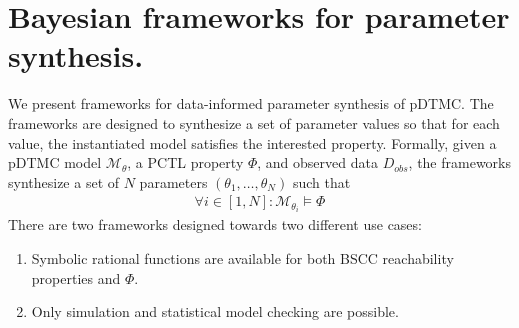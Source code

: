 \chapter{Bayesian frameworks for parameter synthesis.}
We present frameworks for data-informed parameter synthesis of pDTMC. The frameworks are designed to
synthesize a set of parameter values so that for each value, the instantiated model satisfies the
interested property. Formally, given a pDTMC model $\mathcal{M}_\theta$, a PCTL property $\Phi$, and
observed data $D_{obs}$, the frameworks synthesize a set of $N$ parameters
$(\theta_1,\ldots,\theta_N)$ such that
\begin{align*}
      \forall i \in [1,N]: \mathcal{M}_{\theta_i} \models \Phi
\end{align*}
There are two frameworks designed towards two different use cases:
\begin{enumerate}
      \item Symbolic rational functions are available for both BSCC reachability properties and $\Phi$.
      \item Only simulation and statistical model checking are possible.
\end{enumerate}

